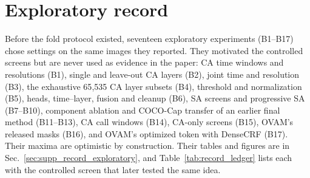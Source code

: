 \section{Exploratory record}
\label{sec:supp_exploratory}
Before the fold protocol existed, seventeen exploratory experiments (B1--B17) chose settings on the same images they reported. They motivated the controlled screens but are never used as evidence in the paper: CA time windows and resolutions (B1), single and leave-out CA layers (B2), joint time and resolution (B3), the exhaustive 65{,}535 CA layer subsets (B4), threshold and normalization (B5), heads, time--layer, fusion and cleanup (B6), SA screens and progressive SA (B7--B10), component ablation and COCO-Cap transfer of an earlier final method (B11--B13), CA call windows (B14), CA-only screens (B15), OVAM's released masks (B16), and OVAM's optimized token with DenseCRF (B17). Their maxima are optimistic by construction. Their tables and figures are in Sec.~\ref{sec:supp_record_exploratory}, and Table~\ref{tab:record_ledger} lists each with the controlled screen that later tested the same idea.
